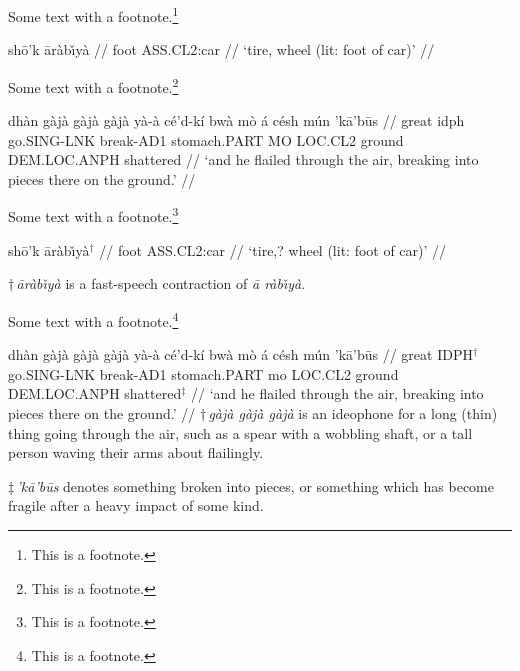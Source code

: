 





Some text with a footnote.\footnote{This is a footnote.}

\ex
{}
\begingl
\gla sh\=o'k {\=ar\`ab{\v\i}y\`a} //
\glb foot {\sc ASS.CL2}:car //
\glft `tire, wheel (lit: foot of car)' //
\endgl
\xe
{}

Some text with a footnote.\footnote{This is a footnote.}

\ex
{}
\begingl
{} dh\`an {g\`aj\`a g\`aj\`a g\`aj\`a} y\`a-\`a c\'e'd-k{\'i} bw\`a
m\`o \'a c\'esh m\'un 'k\=a'b\=us //
 great {{\sc idph}} go.{\sc SING}-{\sc LNK}
break-{\sc AD1} stomach.{\sc PART} {\sc MO} {\sc LOC.CL2} ground
{\sc DEM.LOC.ANPH} {shattered} //
\glft `and he flailed through the air, breaking into pieces there on the
ground.' //
\endgl
\xe
{}

Some text with a footnote.\footnote{This is a footnote.}

\ex
\begingl
\gla sh\=o'k \=ar\`ab{\v\i}y\`a$^{\dag}$ //
\glb foot {\sc ASS.CL2}:car //
\glft `tire,? wheel (lit: foot of car)' //
\endgl

\medskip
$\dag\,${\sl \=ar\`ab{\v\i}y\`a\/} is a fast-speech contraction of
{\sl \=a r\`ab{\v\i}y\`a}.
\xe

Some text with a footnote.\footnote{This is a footnote.}

\ex
\begingl
{} dh\`an {g\`aj\`a g\`aj\`a g\`aj\`a} y\`a-\`a c\'e'd-k{\'i} bw\`a
m\`o \'a c\'esh m\'un 'k\=a'b\=us //
 great {\sc IDPH}$^{\dag}$ go.{\sc SING}-{\sc LNK}
break-{\sc AD1} stomach.{\sc PART} {\sc mo} {\sc LOC.CL2} ground
{\sc DEM.LOC.ANPH} shattered$^{\ddag}$ //
\glft `and he flailed through the air, breaking into pieces there on the
ground.' //
\endgl
\medskip
\footnotesize
$\dag\,${\sl g\`aj\`a g\`aj\`a g\`aj\`a\/} is an ideophone for a long (thin)
thing going through the air, such as a spear with a wobbling shaft, or a tall
person waving their arms about flailingly.

$\ddag\,${\sl 'k\=a'b\=us\/} denotes something broken into pieces, or something
which has become fragile after a heavy impact of some kind.
\xe

